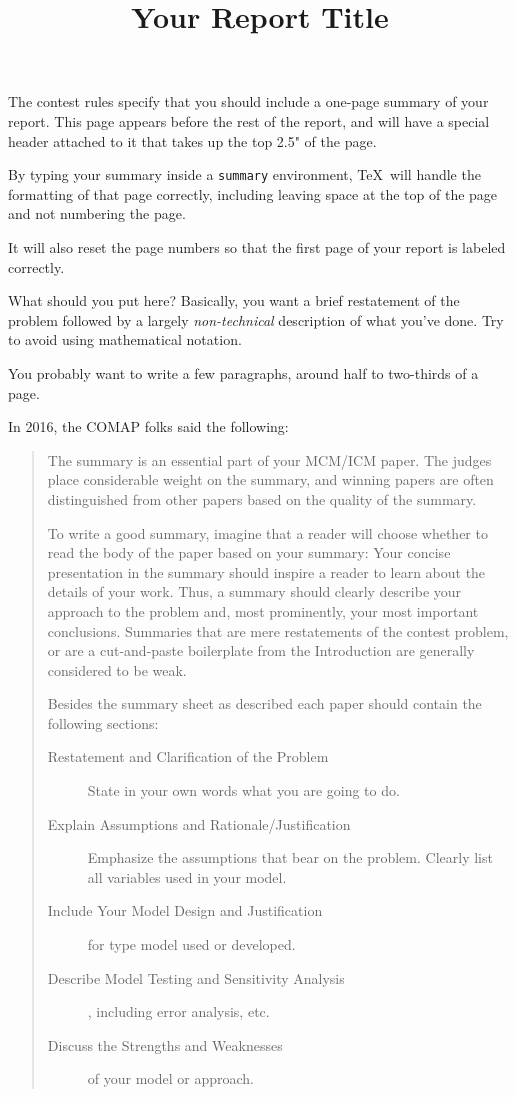 \documentclass{icmmcm}
\title{Your Report Title}
\begin{document}

\begin{summary}
  The contest rules specify that you should include a one-page summary
  of your report.  This page appears before the rest of the report,
  and will have a special header attached to it that takes up the top
  2.5" of the page.

  By typing your summary inside a \texttt{summary} environment, \TeX\ will
  handle the formatting of that page correctly, including leaving
  space at the top of the page and not numbering the page.
  
  It will also reset the page numbers so that the first page of your
  report is labeled correctly.
  
  What should you put here?  Basically, you want a brief restatement
  of the problem followed by a largely \emph{non-technical}
  description of what you've done.  Try to avoid using mathematical
  notation.
  
  You probably want to write a few paragraphs, around half to
  two-thirds of a page.

  In 2016, the COMAP folks said the following:
  \begin{quotation}
    The summary is an essential part of your MCM/ICM paper. The
    judges place considerable weight on the summary, and winning
    papers are often distinguished from other papers based on the
    quality of the summary.

    To write a good summary, imagine that a reader will choose
    whether to read the body of the paper based on your summary:
    Your concise presentation in the summary should inspire a
    reader to learn about the details of your work. Thus, a
    summary should clearly describe your approach to the problem
    and, most prominently, your most important conclusions.
    Summaries that are mere restatements of the contest problem,
    or are a cut-and-paste boilerplate from the Introduction are
    generally considered to be weak.

    Besides the summary sheet as described each paper should
    contain the following sections:

    \begin{description}
    \item[Restatement and Clarification of the Problem] State in
      your own words what you are going to do.
    \item[Explain Assumptions and Rationale/Justification]
      Emphasize the assumptions that bear on the problem. Clearly
      list all variables used in your model.
    \item[Include Your Model Design and Justification] for type
      model used or developed.
    \item[Describe Model Testing and Sensitivity Analysis],
      including error analysis, etc.
    \item[Discuss the Strengths and Weaknesses] of your model or
      approach.
  \end{description}
 \citep{comap-mcm-rules}
\end{quotation}

\end{summary}
 
\end{document}
